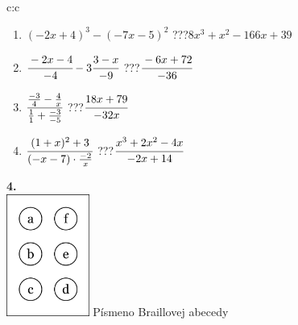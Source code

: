 \documentclass[10pt]{report}
\begin{document}
\begin{tabular}{c:c}
\begin{minipage}[c][104.5mm][t]{0.5\linewidth}
\begin{center}
\begin{minipage}{0.79\linewidth}
\begin{center}
\begin{varwidth}{\linewidth}
\begin{enumerate}
\item $(-2x+4)^3-(-7x-5)^2$\quad \dotfill\; ???\;\dotfill \quad $8x^3+x^2-166x+39$
\item $\cfrac{-2x-4}{-4}-3\cfrac{3-x}{-9}$\quad \dotfill\; ???\;\dotfill \quad $\cfrac{-6x+72}{-36}$
\item $\cfrac{\frac{-3}{4}-\frac{4}{x}}{\frac{1}{1}+\frac{-3}{-5}}$\quad \dotfill\; ???\;\dotfill \quad $\cfrac{18x+79}{-32x}$
\item $\cfrac{(1+x)^2+3}{(-x-7)\cdot\frac{-2}{x}}$\quad \dotfill\; ???\;\dotfill \quad $\cfrac{x^3+2x^2-4x}{-2x+14}$
\end{enumerate}
\end{varwidth}
\end{center}
\end{minipage}
\begin{minipage}{0.20\linewidth}
\begin{center}
{\Huge\bfseries 4.} \\[2mm]
\includegraphics[height=40mm]{../images/braille.png}
{\small Písmeno Braillovej abecedy}
\end{center}
\end{minipage}
\end{center}
\end{minipage}
%
\end{tabular}
\newpage
\thispagestyle{empty}
\end{document}
